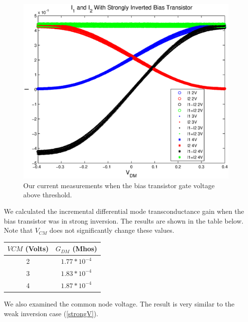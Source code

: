 \documentclass{article}
\begin{document}
\begin{figure}[H]
\centering
\includegraphics[scale=.8]{currents_strong.eps}
\caption{Our current measurements when the bias transistor gate voltage above threshold.}
\label{strong}
\end{figure}

We calculated the incremental differential mode transconductance gain when the bias transistor was in strong inversion. The results are shown in the table below. Note that $V_{CM}$ does not significantly change these values.

\begin{center}
\begin{tabular} {|c|c|}
\hline
$V{CM}$ (Volts) & $G_{DM}$ (Mhos) \\ 
\hline
2  & $1.77 *10^{-4}$ \\
3 & $1.83 *10^{-4}$ \\
4 & $1.87 *10^{-4}$ \\
\hline
\end{tabular}
\end{center}

We also examined the common node voltage. The result is very similar to the weak inversion case (\ref{strongV}).
\end{document}
